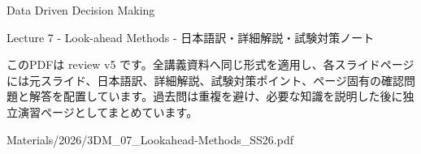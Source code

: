 \documentclass[a4paper,landscape,9pt]{article}
\begin{document}
\begin{titlepage}
\centering
\vspace*{2cm}
{\Huge Data Driven Decision Making\par}
\vspace{0.5cm}
{\Large Lecture 7 - Look-ahead Methods - 日本語訳・詳細解説・試験対策ノート\par}
\vspace{1cm}
\begin{minipage}{0.82\textwidth}
このPDFは review v5 です。全講義資料へ同じ形式を適用し、各スライドページには元スライド、日本語訳、詳細解説、試験対策ポイント、ページ固有の確認問題と解答を配置しています。過去問は重複を避け、必要な知識を説明した後に独立演習ページとしてまとめています。
\end{minipage}
\vfill
{\large Materials/2026/3DM\_07\_Lookahead-Methods\_SS26.pdf}
\end{titlepage}
\tableofcontents
\clearpage

\end{document}

